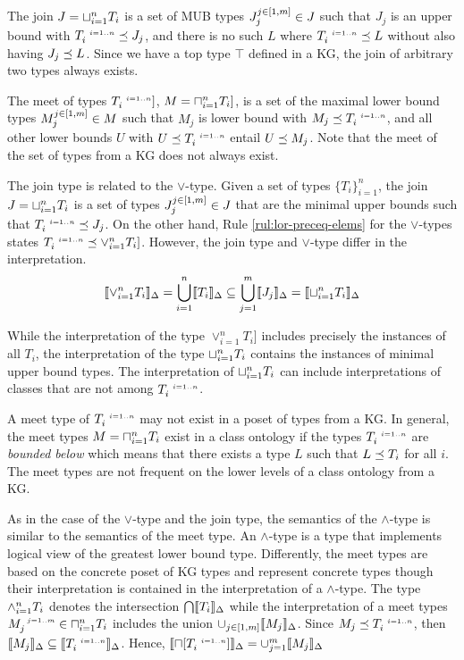 \documentclass[runningheads]{llncs}
\newcommand{\s}{\scriptscriptstyle\ \,}
\newcommand{\llb}{\llbracket}
\newcommand{\rrb}{\rrbracket}
\begin{document}
The join $J=\sqcup_{i=1}^n\/T_i$ is a set of MUB types
$J_j^{j\in[1,m]}\in\/J$ such that $J_j$ is an upper bound with
$T_i^{\s\/i=1..n}\preceq\/J_j$, and there is no such $L$ where
$T_i^{\s\/i=1..n}\preceq\/L$ without also having $J_j\preceq\/L$. Since
we have a top type $\top$ defined in a KG, the join of arbitrary two
types always exists.

The meet of types $T_i^{\s\/i=1..n}]$, $M=\sqcap_{i=1}^n\/T_i]$, is
a set of the maximal lower bound types $M_j^{j\in[1,m]}\in\/M$ such
that $M_j$ is lower bound with $M_j\preceq\/T_i^{\s\/i=1..n}$, and all
other lower bounds $U$ with $U\preceq\/T_i^{\s\/i=1..n}$ entail
$U\preceq\/M_j$. Note that the meet of the set of types from a KG does
not always exist.

The join type is related to the $\lor$-type. Given a set of types
$\{T_i\}_{i=1}^n$, the join $J=\sqcup_{i=1}^n\/T_i$ is a set of types
$J_j^{j\in[1,m]}\in\/J$ that are the minimal upper bounds such that
$T_i^{\s\/i=1..n}\preceq\/J_j$. On the other hand, Rule
\ref{rul:lor-preceq-elems} for the $\lor$-types states
$T_i^{\s\/i=1..n}\preceq\lor_{i=1}^n\/T_i]$. However, the join type and $\lor$-type
differ in the interpretation.
$$\llb\lor_{i=1}^n\/T_i\rrb_\D=\bigcup_{i=1}^n\llb\/T_i\rrb_\D\subseteq\bigcup_{j=1}^m\llb\/J_j\rrb_\D=\llb\sqcup_{i=1}^n\/T_i\rrb_\D$$

While the interpretation of the type $\lor_{i=1}^nT_i]$ includes
precisely the instances of all $T_i$, the interpretation of the type
$\sqcup_{i=1}^n\/T_i$ contains the instances of minimal upper bound
types. The interpretation of $\sqcup_{i=1}^n\/T_i$ can include
interpretations of classes that are not among $T_i^{\s\/i=1..n}$.

A meet type of $T_i^{\s\/i=1..n}$ may not exist in a poset of types
from a KG. In general, the meet types $M=\sqcap_{i=1}^n\/T_i$
exist in a class ontology if the types $T_i^{\s\/i=1..n}$ are
\emph{bounded below} \cite{Pierce2002} which means that there exists a
type $L$ such that $L\preceq\/T_i$ for all $i$. The meet types are not
frequent on the lower levels of a class ontology from a KG.

As in the case of the $\lor$-type and the join type, the semantics of
the $\land$-type is similar to the semantics of the meet type. An
$\land$-type is a type that implements logical view of the greatest
lower bound type. Differently, the meet types are based on the
concrete poset of KG types and represent concrete types though their
interpretation is contained in the interpretation of a
$\land$-type. The type $\land_{i=1}^n\/T_i$ denotes the intersection
$\bigcap\/\llb\/T_i\rrb_\D$ while the interpretation of a meet types
$M_j^{\s\/j=1..m}\in\sqcap_{i=1}^n\/T_i$ includes the union
$\cup_{j\in[1,m]}\llb\/M_j\rrb_\D$. Since
$M_j\preceq\/T_i^{\s\/i=1..n}$, then
$\llb\/M_j\rrb_\D\subseteq\llb\/T_i^{\s\/i=1..n}\rrb_\D$. Hence,
$\llb\sqcap[T_i^{\s\/i=1..n}]\rrb_\D=\cup_{j=1}^m\llb\/M_j\rrb_\D$
\end{document}
